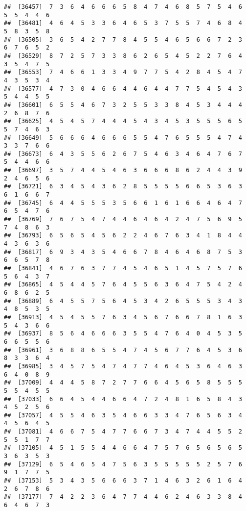 \documentclass[
]{book}
\begin{document}
\begin{verbatim}
##  [36457]  7  3  6  4  6  6  6  5  8  4  7  4  6  8  5  7  5  4  6  5  5  4  4  6
##  [36481]  4  6  4  5  3  3  6  4  6  5  3  7  5  5  7  4  6  8  4  5  8  3  5  8
##  [36505]  3  6  5  4  2  7  7  8  4  5  5  4  6  5  6  6  7  2  3  6  7  6  5  2
##  [36529]  8  7  2  5  7  3  3  8  6  2  6  5  4  5  2  2  7  6  4  3  5  4  7  5
##  [36553]  7  4  6  6  1  3  3  4  9  7  7  5  4  2  8  4  5  4  7  4  3  5  3  4
##  [36577]  4  7  3  0  4  6  6  4  4  6  4  4  7  7  5  4  5  4  3  5  4  4  5  5
##  [36601]  6  5  5  4  6  7  3  2  5  5  3  3  8  4  5  3  4  4  4  2  6  8  7  6
##  [36625]  4  5  4  5  7  4  4  4  5  4  3  4  5  3  5  5  5  6  5  5  7  4  6  3
##  [36649]  5  6  6  6  4  6  6  6  5  5  4  7  6  5  5  5  4  7  4  3  3  7  6  6
##  [36673]  6  4  3  5  5  6  2  6  7  5  4  6  3  4  6  4  7  6  7  5  4  4  6  6
##  [36697]  3  5  7  4  4  5  4  6  3  6  6  6  8  6  2  4  4  3  9  2  4  6  5  6
##  [36721]  6  3  4  5  4  3  6  2  8  5  5  5  5  6  6  5  3  6  3  6  1  6  6  7
##  [36745]  6  4  4  5  5  5  3  5  6  6  1  6  1  6  6  4  6  4  7  6  5  4  7  6
##  [36769]  7  6  7  5  4  7  4  4  6  4  6  4  2  4  7  5  6  9  5  7  4  8  6  3
##  [36793]  6  5  6  5  4  5  6  2  2  4  6  7  6  3  4  1  8  4  4  4  3  6  3  6
##  [36817]  6  9  3  4  3  5  4  6  6  7  8  4  6  4  6  8  7  5  3  6  6  5  7  8
##  [36841]  4  6  7  6  3  7  7  4  5  4  6  5  1  4  5  7  5  7  6  5  6  4  3  7
##  [36865]  4  5  4  4  5  7  6  4  5  5  6  3  6  4  7  5  4  2  4  6  8  6  2  5
##  [36889]  6  4  5  5  7  5  6  4  5  3  4  2  6  5  5  5  3  4  3  4  8  5  3  5
##  [36913]  4  5  4  5  5  7  6  3  4  5  6  7  6  6  7  8  1  6  3  5  4  3  6  6
##  [36937]  8  5  6  4  6  6  6  3  5  5  4  7  6  4  0  4  5  3  5  6  6  5  5  6
##  [36961]  3  6  8  8  6  5  5  4  7  4  5  6  7  7  6  4  5  3  6  8  3  3  6  4
##  [36985]  3  4  5  7  5  4  7  4  7  7  4  6  4  5  3  6  4  6  3  6  4  0  8  9
##  [37009]  4  4  4  5  8  7  2  7  7  6  6  4  5  6  5  8  5  5  5  5  5  4  5  5
##  [37033]  6  6  4  5  4  4  6  6  4  7  2  4  8  1  6  5  8  4  3  4  5  2  5  6
##  [37057]  4  5  5  4  6  3  5  4  6  6  3  3  4  7  6  5  6  3  4  4  5  6  4  5
##  [37081]  4  6  6  7  5  4  7  7  6  6  7  3  4  7  4  4  5  5  2  5  5  1  7  7
##  [37105]  4  5  1  5  5  4  4  6  6  4  7  5  7  6  5  6  5  6  5  3  6  3  5  3
##  [37129]  6  5  4  6  5  4  7  5  6  3  5  5  5  5  5  2  5  7  6  9  1  7  7  5
##  [37153]  5  3  4  3  5  6  6  6  3  7  1  4  6  3  2  6  1  6  4  2  6  7  8  6
##  [37177]  7  4  2  2  3  6  4  7  7  4  4  6  2  4  6  3  3  8  4  6  4  6  7  3

\end{verbatim}
\end{document}
